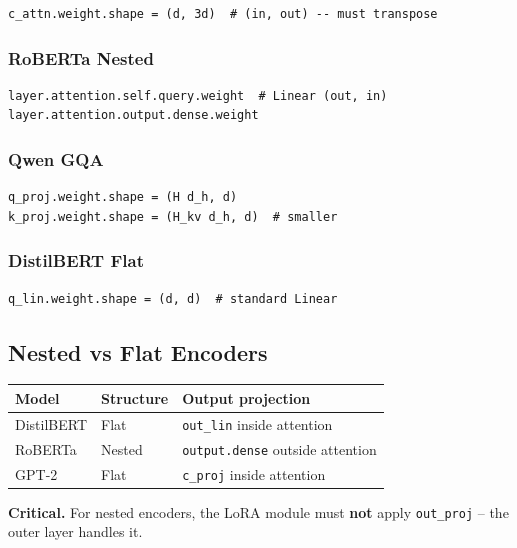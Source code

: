 \begin{lstlisting}
c_attn.weight.shape = (d, 3d)  # (in, out) -- must transpose
\end{lstlisting}

\subsubsection{RoBERTa Nested}

\begin{lstlisting}
layer.attention.self.query.weight  # Linear (out, in)
layer.attention.output.dense.weight
\end{lstlisting}

\subsubsection{Qwen GQA}

\begin{lstlisting}
q_proj.weight.shape = (H d_h, d)
k_proj.weight.shape = (H_kv d_h, d)  # smaller
\end{lstlisting}

\subsubsection{DistilBERT Flat}

\begin{lstlisting}
q_lin.weight.shape = (d, d)  # standard Linear
\end{lstlisting}

\subsection{Nested vs Flat Encoders}

\begin{table}[H]
\centering
\small
\begin{tabular}{lll}
\toprule
\textbf{Model} & \textbf{Structure} & \textbf{Output projection} \\
\midrule
DistilBERT & Flat & \texttt{out\_lin} inside attention \\
RoBERTa & Nested & \texttt{output.dense} outside attention \\
GPT-2 & Flat & \texttt{c\_proj} inside attention \\
\bottomrule
\end{tabular}
\end{table}

\textbf{Critical.} For nested encoders, the LoRA module must \textbf{not} apply 
\texttt{out\_proj} -- the outer layer handles it.

